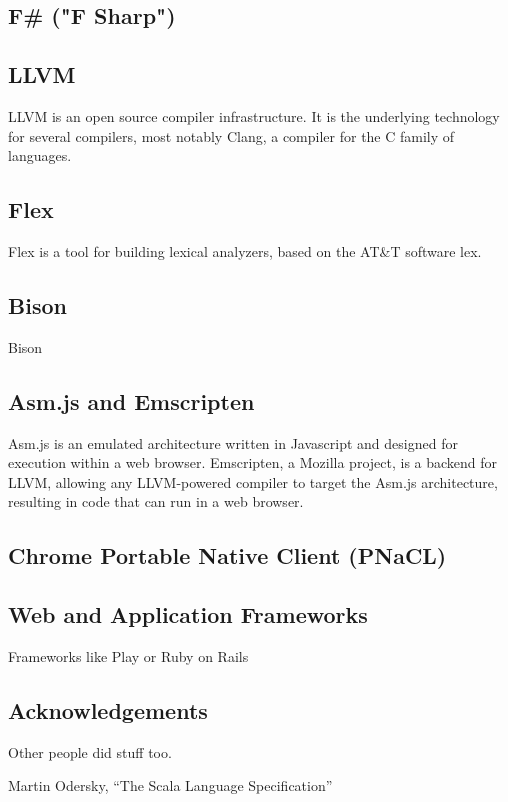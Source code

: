\subsection{F\# ("F Sharp")}

\subsection{LLVM}
LLVM is an open source compiler infrastructure. It is the underlying technology for several compilers, most notably Clang, a compiler for the C family of languages.

\subsection{Flex}
Flex is a tool for building lexical analyzers, based on the AT\&T software lex.

\subsection{Bison}
Bison

\subsection{Asm.js and Emscripten}
Asm.js is an emulated architecture written in Javascript and designed for execution within a web browser. Emscripten, a Mozilla project, is a backend for LLVM, allowing any LLVM-powered compiler to target the Asm.js architecture, resulting in code that can run in a web browser.

\subsection{Chrome Portable Native Client (PNaCL)}

\subsection{Web and Application Frameworks}
Frameworks like Play or Ruby on Rails 

\subsection*{Acknowledgements}
Other people did stuff too.

\begin{thebibliography}{9}

Martin Odersky, 
``The Scala Language Specification''


\end{thebibliography}

